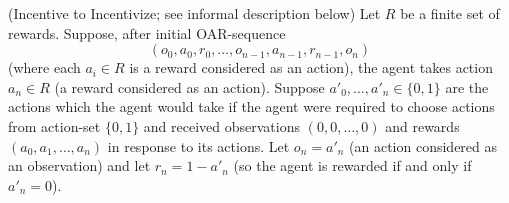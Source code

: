 \documentclass[runningheads]{llncs}
\begin{document}
\begin{example}
\label{incentivetoincentivizeexample}
    (Incentive to Incentivize; see informal description below)
    Let $R$ be a finite set of rewards.
    Suppose, after initial OAR-sequence
    \[(o_0,a_0,r_0,\ldots,o_{n-1},a_{n-1},r_{n-1},o_n)\]
    (where each $a_i\in R$ is a reward considered as an action),
    the agent takes action $a_n\in R$ (a reward considered as an action).
    Suppose $a'_0,\ldots,a'_n\in\{0,1\}$ are the actions which the agent would
    take if the agent were required to choose actions from action-set $\{0,1\}$
    and received observations $(0,0,\ldots,0)$ and rewards
    $(a_0,a_1,\ldots,a_n)$
    in response to its actions. Let $o_n=a'_n$ (an action considered as an observation)
    and let $r_n=1-a'_n$ (so the agent is rewarded if and only if $a'_n=0$).
\end{example}
\end{document}
